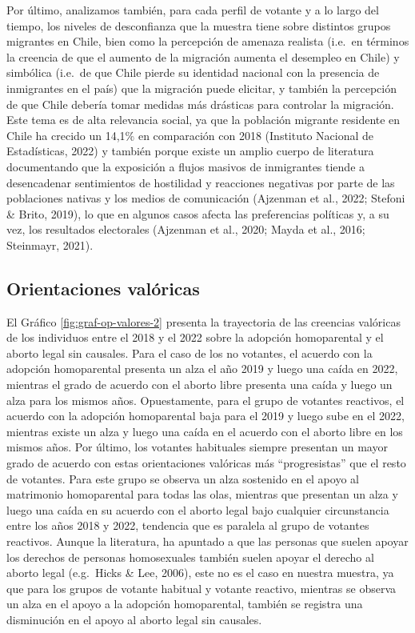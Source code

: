 \documentclass[
  12pt,
]{book}
\begin{document}
Por último, analizamos también, para cada perfil de votante y a lo largo del tiempo, los niveles de desconfianza que la muestra tiene sobre distintos grupos migrantes en Chile, bien como la percepción de amenaza realista (i.e.~en términos la creencia de que el aumento de la migración aumenta el desempleo en Chile) y simbólica (i.e.~de que Chile pierde su identidad nacional con la presencia de inmigrantes en el país) que la migración puede elicitar, y también la percepción de que Chile debería tomar medidas más drásticas para controlar la migración. Este tema es de alta relevancia social, ya que la población migrante residente en Chile ha crecido un 14,1\% en comparación con 2018 (Instituto Nacional de Estadísticas, 2022) y también porque existe un amplio cuerpo de literatura documentando que la exposición a flujos masivos de inmigrantes tiende a desencadenar sentimientos de hostilidad y reacciones negativas por parte de las poblaciones nativas y los medios de comunicación (Ajzenman et al., 2022; Stefoni \& Brito, 2019), lo que en algunos casos afecta las preferencias políticas y, a su vez, los resultados electorales (Ajzenman et al., 2020; Mayda et al., 2016; Steinmayr, 2021).

\hypertarget{orientaciones-valuxf3ricas}{%
\subsection{Orientaciones valóricas}\label{orientaciones-valuxf3ricas}}

El Gráfico \ref{fig:graf-op-valores-2} presenta la trayectoria de las creencias valóricas de los individuos entre el 2018 y el 2022 sobre la adopción homoparental y el aborto legal sin causales. Para el caso de los no votantes, el acuerdo con la adopción homoparental presenta un alza el año 2019 y luego una caída en 2022, mientras el grado de acuerdo con el aborto libre presenta una caída y luego un alza para los mismos años. Opuestamente, para el grupo de votantes reactivos, el acuerdo con la adopción homoparental baja para el 2019 y luego sube en el 2022, mientras existe un alza y luego una caída en el acuerdo con el aborto libre en los mismos años. Por último, los votantes habituales siempre presentan un mayor grado de acuerdo con estas orientaciones valóricas más ``progresistas'' que el resto de votantes. Para este grupo se observa un alza sostenido en el apoyo al matrimonio homoparental para todas las olas, mientras que presentan un alza y luego una caída en su acuerdo con el aborto legal bajo cualquier circunstancia entre los años 2018 y 2022, tendencia que es paralela al grupo de votantes reactivos. Aunque la literatura, ha apuntado a que las personas que suelen apoyar los derechos de personas homosexuales también suelen apoyar el derecho al aborto legal (e.g.~Hicks \& Lee, 2006), este no es el caso en nuestra muestra, ya que para los grupos de votante habitual y votante reactivo, mientras se observa un alza en el apoyo a la adopción homoparental, también se registra una disminución en el apoyo al aborto legal sin causales.
\end{document}
